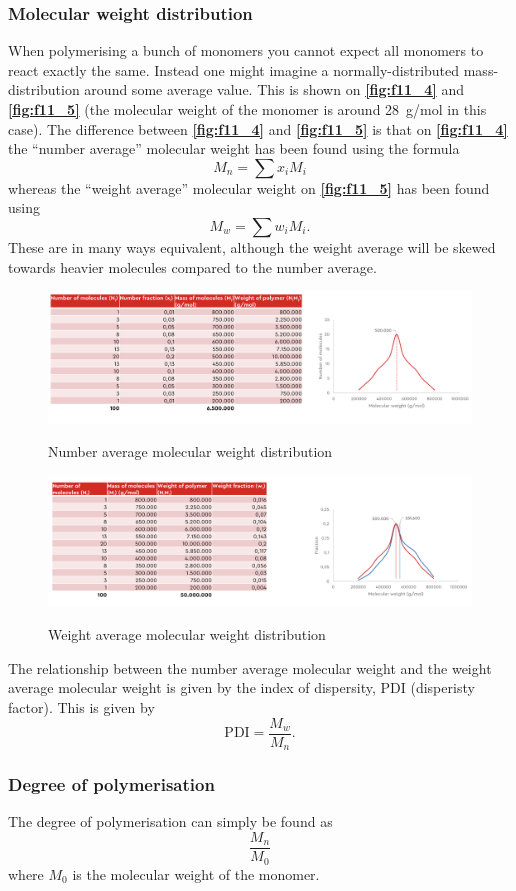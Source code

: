 \subsubsection{Molecular weight distribution}
When polymerising a bunch of monomers you cannot expect all monomers to react exactly the same. Instead one might imagine a normally-distributed mass-distribution around some average value. This is shown on \textbf{\autoref{fig:f11_4}} and \textbf{\autoref{fig:f11_5}} (the molecular weight of the monomer is around \qty{28}{g/mol} in this case). The difference between \textbf{\autoref{fig:f11_4}} and \textbf{\autoref{fig:f11_5}} is that on \textbf{\autoref{fig:f11_4}} the ``number average'' molecular weight has been found using the formula
\[ 
M_n = \sum x_i M_i
\]
whereas the ``weight average'' molecular weight on \textbf{\autoref{fig:f11_5}} has been found using
\[ 
M_w = \sum w_i M_i
.\]
These are in many ways equivalent, although the weight average will be skewed towards heavier molecules compared to the number average.
\begin{figure} [ht]
  \centering
  \caption{Number average molecular weight distribution}
  \includegraphics[width=0.75\linewidth]{./figures/f11_4.png}
  \label{fig:f11_4}
\end{figure}
\begin{figure} [ht]
  \centering
  \caption{Weight average molecular weight distribution}
  \includegraphics[width=0.75\linewidth]{./figures/f11_5.png}
  \label{fig:f11_5}
\end{figure}

The relationship between the number average molecular weight and the weight average molecular weight is given by the index of dispersity, $\mathrm{PDI}$ (disperisty factor). This is given by
\[ 
\mathrm{PDI} = \frac{M_w}{M_n}
.\]

\subsubsection{Degree of polymerisation}
The degree of polymerisation can simply be found as
\[ 
\frac{M_n}{M_0}
\]
where $M_0$ is the molecular weight of the monomer.

